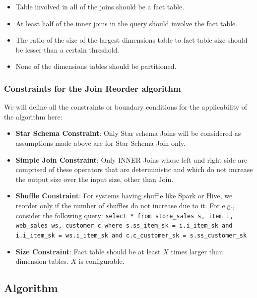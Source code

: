 \begin{itemize}
\item Table involved in all of the joins should be a fact table.
\item At least half of the inner joins in the query should involve the fact table.
\item The ratio of the size of the largest dimensions table to fact table size should be lesser than a certain threshold.
\item None of the dimensions tables should be partitioned.
\end{itemize}

\subsubsection{Constraints for the Join Reorder algorithm}
We will define all the constraints or boundary conditions for the applicability of the algorithm here:

\begin{itemize}
\item \textbf{Star Schema Constraint}: Only Star schema Joins will be considered as assumptions made above are for Star Schema Join only.
\item \textbf{Simple Join Constraint}: Only INNER Joins whose left and right side are comprised of these operators that are deterministic and which do not increase the output size over the input size, other than Join.
\item \textbf{Shuffle Constraint}: For systems having shuffle like Spark or Hive, we reorder only if the number of shuffles do not increase due to it. For e.g., consider the following query: \texttt{select * from store\_sales s, item i, web\_sales ws, customer c where s.ss\_item\_sk = i.i\_item\_sk and i.i\_item\_sk = ws.i\_item\_sk and c.c\_customer\_sk = s.ss\_customer\_sk}
\item \textbf{Size Constraint}: Fact table should be at least $X$ times larger than dimension tables. $X$ is configurable.
\end{itemize}

\subsection{Algorithm}

